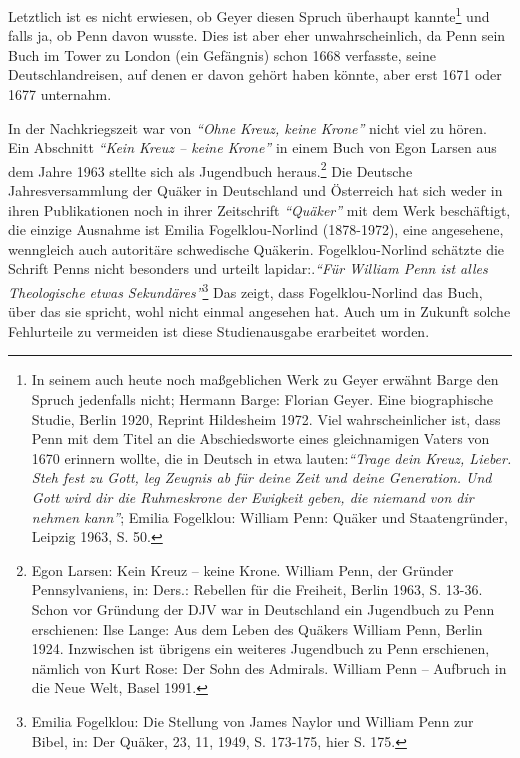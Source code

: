 Letztlich ist es nicht erwiesen, ob Geyer diesen Spruch überhaupt
kannte\footnote{In seinem auch heute noch maßgeblichen Werk zu Geyer erwähnt
Barge den
Spruch jedenfalls nicht; Hermann Barge: Florian Geyer. Eine biographische
Studie, Berlin 1920, Reprint Hildesheim 1972. Viel wahrscheinlicher ist, dass
Penn mit dem Titel an die Abschiedsworte eines gleichnamigen Vaters von 1670
erinnern wollte, die in Deutsch in etwa lauten:\textit{"`Trage dein Kreuz, Lieber. Steh
fest zu Gott, leg Zeugnis ab für deine Zeit und deine Generation. Und Gott wird
dir die Ruhmeskrone der Ewigkeit geben, die niemand von dir nehmen kann"'}; 
Emilia Fogelklou: William Penn: Quäker und Staatengründer, Leipzig 1963, S. 50.}
und falls ja, ob Penn davon wusste. Dies ist aber eher unwahrscheinlich, da Penn
sein Buch im Tower zu London (ein Gefängnis) schon 1668 verfasste, seine Deutschlandreisen, auf
denen er davon gehört haben könnte, aber erst 1671 oder 1677 unternahm.

\medskip

In der Nachkriegszeit war von \textit{"`Ohne Kreuz, keine Krone"'} nicht viel zu hören.
Ein Abschnitt \textit{"`Kein Kreuz -- keine Krone"'} in einem Buch von Egon Larsen aus
dem Jahre 1963 stellte sich als Jugendbuch heraus.\footnote{Egon Larsen: Kein
Kreuz -- keine Krone. William Penn, der Gründer
Pennsylvaniens, in: Ders.: Rebellen für die Freiheit, Berlin 1963, S. 13-36. Schon vor Gründung der DJV war in Deutschland ein Jugendbuch zu Penn erschienen: Ilse Lange: Aus dem Leben
des Quäkers William Penn, Berlin 1924. Inzwischen ist übrigens ein weiteres Jugendbuch zu Penn erschienen, nämlich von
Kurt Rose: Der Sohn des Admirals. William Penn -- Aufbruch in die Neue Welt,
Basel 1991.} Die Deutsche
Jahresversammlung der Quäker in Deutschland und Österreich hat sich weder in
ihren Publikationen noch in ihrer Zeitschrift \textit{"`Quäker"'} mit dem Werk beschäftigt,
die einzige Ausnahme ist Emilia Fogelklou-Norlind (1878-1972), eine angesehene,
wenngleich auch autoritäre schwedische Quäkerin. Fogelklou-Norlind schätzte die
Schrift Penns nicht besonders und urteilt lapidar:.\textit{"`Für William Penn ist alles
Theologische etwas Sekundäres"'}\footnote{Emilia Fogelklou: Die Stellung von
James Naylor und William Penn zur Bibel,
in: Der Quäker, 23, 11, 1949, S. 173-175, hier S. 175.} Das zeigt, dass
Fogelklou-Norlind das Buch, über das sie spricht, wohl nicht einmal angesehen
hat. Auch um in Zukunft solche Fehlurteile zu vermeiden ist diese Studienausgabe
erarbeitet worden.





